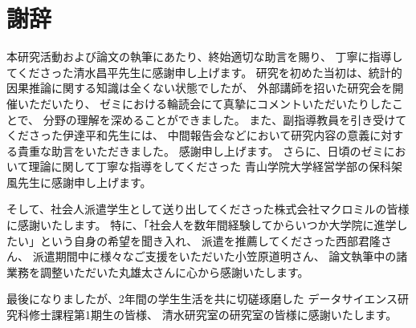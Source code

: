 %
\section*{謝辞}
%
本研究活動および論文の執筆にあたり、終始適切な助言を賜り、
丁寧に指導してくださった清水昌平先生に感謝申し上げます。
研究を初めた当初は、統計的因果推論に関する知識は全くない状態でしたが、
外部講師を招いた研究会を開催いただいたり、
ゼミにおける輪読会にて真摯にコメントいただいたりしたことで、
分野の理解を深めることができました。
また、副指導教員を引き受けてくださった伊達平和先生には、
中間報告会などにおいて研究内容の意義に対する貴重な助言をいただきました。
感謝申し上げます。
さらに、日頃のゼミにおいて理論に関して丁寧な指導をしてくださった
青山学院大学経営学部の保科架風先生に感謝申し上げます。

そして、社会人派遣学生として送り出してくださった株式会社マクロミルの皆様に感謝いたします。
特に、「社会人を数年間経験してからいつか大学院に進学したい」という自身の希望を聞き入れ、
派遣を推薦してくださった西部君隆さん、
派遣期間中に様々なご支援をいただいた小笠原道明さん、
論文執筆中の諸業務を調整いただいた丸雄太さんに心から感謝いたします。

最後になりましたが、2年間の学生生活を共に切磋琢磨した
データサイエンス研究科修士課程第1期生の皆様、
清水研究室の研究室の皆様に感謝いたします。
